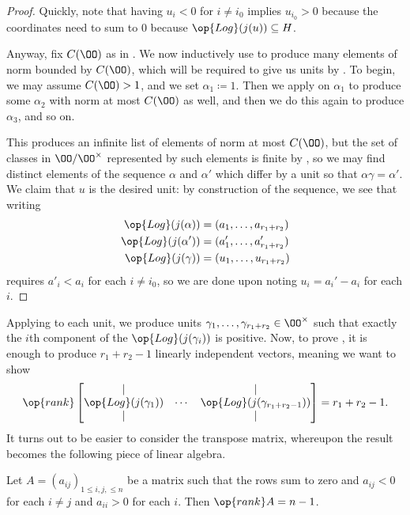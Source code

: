\documentclass[../notes.tex]{subfiles}
\begin{document}
\begin{proof}
	Quickly, note that having $u_i<0$ for $i\ne i_0$ implies $u_{i_0}>0$ because the coordinates need to sum to $0$ because $\op{Log}(j(u))\subseteq H$.

	Anyway, fix $C(\OO)$ as in . We now inductively use  to produce many elements of norm bounded by $C(\OO)$, which will be required to give us units by . To begin, we may assume $C(\OO)>1$, and we set $\alpha_1\coloneqq1$. Then we apply  on $\alpha_1$ to produce some $\alpha_2$ with norm at most $C(\OO)$ as well, and then we do this again to produce $\alpha_3$, and so on.

	This produces an infinite list of elements of norm at most $C(\OO)$, but the set of classes in $\OO/\OO^\times$ represented by such elements is finite by , so we may find distinct elements of the sequence $\alpha$ and $\alpha'$ which differ by a unit so that $\alpha\gamma=\alpha'$. We claim that $u$ is the desired unit: by construction of the sequence, we see that writing
	\begin{align*}
		\op{Log}(j(\alpha)) &= (a_1,\ldots,a_{r_1+r_2}) \\
		\op{Log}(j(\alpha')) &= (a'_1,\ldots,a'_{r_1+r_2}) \\
		\op{Log}(j(\gamma)) &= (u_1,\ldots,u_{r_1+r_2})
	\end{align*}
	requires $a'_i<a_i$ for each $i\ne i_0$, so we are done upon noting $u_i=a_i'-a_i$ for each $i$.
\end{proof}
Applying  to each unit, we produce units $\gamma_1,\ldots,\gamma_{r_1+r_2}\in\OO^\times$ such that exactly the $i$th component of the $\op{Log}(j(\gamma_i))$ is positive. Now, to prove , it is enough to produce $r_1+r_2-1$ linearly independent vectors, meaning we want to show
\[\op{rank}\begin{bmatrix}
	| & & | \\
	\op{Log}(j(\gamma_1)) & \cdots & \op{Log}(j(\gamma_{r_1+r_2-1})) \\
	| & & |
\end{bmatrix}=r_1+r_2-1.\]
It turns out to be easier to consider the transpose matrix, whereupon the result becomes the following piece of linear algebra.
\begin{lemma}
	Let $A=(a_{ij})_{1\le i,j,\le n}$ be a matrix such that the rows sum to zero and $a_{ij}<0$ for each $i\ne j$ and $a_{ii}>0$ for each $i$. Then $\op{rank}A=n-1$.
\end{lemma}
\end{document}
